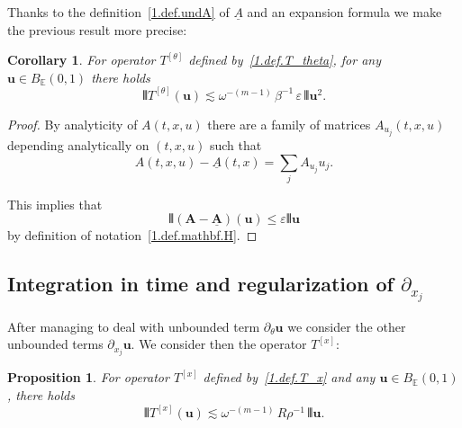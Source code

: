 \documentclass[10pt]{amsart}
\newtheorem{prop}[cdrthm]{Proposition}
\newtheorem{coro}[cdrthm]{Corollary}
\theoremstyle{definition}
\theoremstyle{plain}
\newcommand*\e{\varepsilon}
\newcommand{\dptl}{\partial}%
\newcommand*\EE{{\mathbb E}}
\newcommand{\ubf}{{\mathbf u}}
\newcommand*\und{\underline}
\DeclarePairedDelimiter{\VERT}{|\mkern -1.6mu|\mkern -1.6mu|}{|\mkern -1.6mu|\mkern -1.6mu|}
\begin{document}
Thanks to the definition~\eqref{1.def.undA} of $\und{A}$ and an expansion formula we make the previous result more precise:

\begin{coro}\label{1.reg_dtheta.bis}
For operator $T^{[\theta]}$ defined by~\eqref{1.def.T_theta}, for any $\ubf\in B_{\EE}(0,1)$ there holds
\begin{equation}\label{1.esti.reg_dtheta.bis}
\VERT{T^{[\theta]}(\ubf)} \lesssim \omega^{-(m-1)}\,\beta^{-1}\, \e \,\VERT{\ubf}^2.
\end{equation}
\end{coro}

\begin{proof}
By analyticity of $A(t,x,u)$ there are a family of matrices $A_{u_j}(t,x,u)$ depending analytically on $(t,x,u)$ such that
\[
A(t,x,u) - \und{A}(t,x) = \sum_j A_{u_j} u_j.
\]


This implies that
\[
\VERT{({\mathbf A} - \und{{\mathbf A}})(\ubf)} \leq \e \VERT{\ubf}
\]
by definition of notation~\eqref{1.def.mathbf.H}.
\end{proof}



\subsection{Integration in time and regularization of \texorpdfstring{$\dptl_{x_j}$}{dxj}}



After managing to deal with unbounded term $\dptl_{\theta}\ubf$ we consider the other unbounded terms $\dptl_{x_j}\ubf$. We consider then the operator $T^{[x]}$:

\begin{prop}\label{1.reg_dx}
For operator $T^{[x]}$ defined by~\eqref{1.def.T_x} and any $\ubf\in B_{\EE}(0,1)$, there holds
\begin{equation}\label{1.esti.reg_dx}
\VERT{T^{[x]}(\ubf)} \lesssim \omega^{-(m-1)}\,R\rho^{-1}\,\VERT{\ubf}.
\end{equation}
\end{prop}
\end{document}
